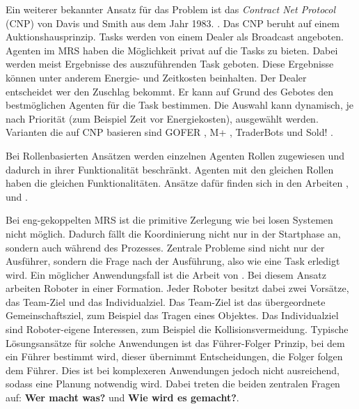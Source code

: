 Ein weiterer bekannter Ansatz für das Problem ist das \textit{Contract Net Protocol} (CNP) von Davis und Smith aus dem Jahr 1983. \cite{davis2003negotiation}. Das CNP beruht auf einem Auktionshausprinzip. Tasks werden von einem Dealer als Broadcast angeboten. Agenten im MRS haben die Möglichkeit privat auf die Tasks zu bieten. Dabei werden meist Ergebnisse des auszuführenden Task geboten. Diese Ergebnisse können unter anderem Energie- und Zeitkosten beinhalten. Der Dealer entscheidet wer den Zuschlag bekommt. Er kann auf Grund des Gebotes den bestmöglichen Agenten für die Task bestimmen. Die Auswahl kann dynamisch, je nach Priorität (zum Beispiel Zeit vor Energiekosten), ausgewählt werden. Varianten die auf CNP basieren sind GOFER \cite{caloud1990indoor}, M+ \cite{botelho1999m+}, TraderBots\cite{dias2000market} und Sold! \cite{gerkey2002sold}.

Bei Rollenbasierten Ansätzen werden einzelnen Agenten Rollen zugewiesen und dadurch in ihrer Funktionalität beschränkt. Agenten mit den gleichen Rollen haben die gleichen Funktionalitäten. Ansätze dafür finden sich in den Arbeiten \cite{frias2005exploring}, \cite{vail2003multi} und \cite{stone1999task}.

Bei eng-gekoppelten MRS ist die primitive Zerlegung wie bei losen Systemen nicht möglich. Dadurch fällt die Koordinierung nicht nur in der Startphase an, sondern auch während des Prozesses. Zentrale Probleme sind nicht nur der Ausführer, sondern die Frage nach der Ausführung, also wie eine Task erledigt wird. Ein möglicher Anwendungsfall ist die Arbeit von \cite{saffiotti2000multi}. Bei diesem Ansatz arbeiten Roboter in einer Formation. Jeder Roboter besitzt dabei zwei Vorsätze, das Team-Ziel und das Individualziel. Das Team-Ziel ist das übergeordnete Gemeinschaftsziel, zum Beispiel das Tragen eines Objektes. Das Individualziel sind Roboter-eigene Interessen, zum Beispiel die Kollisionsvermeidung. Typische Lösungsansätze für solche Anwendungen ist das Führer-Folger Prinzip, bei dem ein Führer bestimmt wird, dieser übernimmt Entscheidungen, die Folger folgen dem Führer. Dies ist bei komplexeren Anwendungen jedoch nicht ausreichend, sodass eine Planung notwendig wird. Dabei treten die beiden zentralen Fragen auf:\textbf{ Wer macht was?} und\textbf{ Wie wird es gemacht?}.

